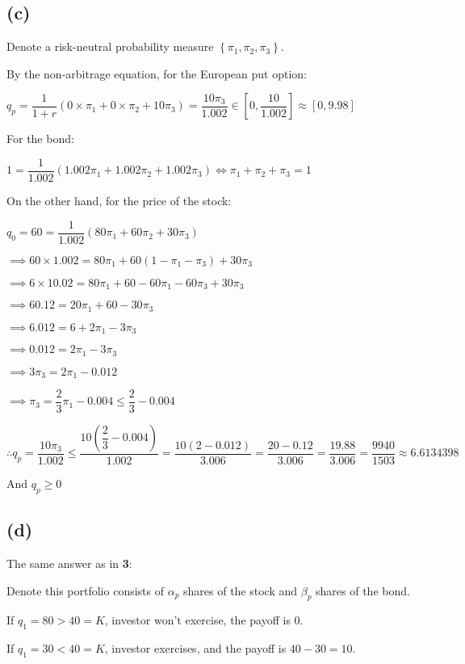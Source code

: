 \documentclass{article}
\begin{document}
\subsection*{(c)}

Denote a risk-neutral probability measure $\left\{\pi_{1}, \pi_{2}, \pi_{3}\right\}$.

By the non-arbitrage equation, for the European put option:

$q_{p}=\dfrac{1}{1+r}\left(0\times\pi_{1}+0\times\pi_{2}+10\pi_{3}\right)=\dfrac{10\pi_{3}}{1.002}\in\left[0,\dfrac{10}{1.002}\right]\approx\left[0,9.98\right]$

For the bond:

$1=\dfrac{1}{1.002}\left(1.002\pi_{1}+1.002\pi_{2}+1.002\pi_{3}\right)\iff\pi_{1}+\pi_{2}+\pi_{3}=1$

On the other hand, for the price of the stock:

$q_{0}=60=\dfrac{1}{1.002}\left(80\pi_{1}+60\pi_{2}+30\pi_{3}\right)$

$\implies60\times1.002=80\pi_{1}+60\left(1-\pi_{1}-\pi_{3}\right)+30\pi_{3}$

$\implies6\times10.02=80\pi_{1}+60-60\pi_{1}-60\pi_{3}+30\pi_{3}$

$\implies60.12=20\pi_{1}+60-30\pi_{3}$

$\implies6.012=6+2\pi_{1}-3\pi_{3}$

$\implies0.012=2\pi_{1}-3\pi_{3}$

$\implies3\pi_{3}=2\pi_{1}-0.012$

$\implies\pi_{3}=\dfrac{2}{3}\pi_{1}-0.004\leqslant\dfrac{2}{3}-0.004$

$\therefore q_{p}=\dfrac{10\pi_{3}}{1.002}\leqslant\dfrac{10\left(\dfrac{2}{3}-0.004\right)}{1.002}=\dfrac{10\left(2-0.012\right)}{3.006}=\dfrac{20-0.12}{3.006}=\dfrac{19.88}{3.006}=\dfrac{9940}{1503}\approx6.6134398$

And $q_{p}\geqslant0$

\subsection*{(d)}

The same answer as in \textbf{3}:

Denote this portfolio consists of $\alpha_{p}$ shares of the stock and $\beta_{p}$ shares of the bond.

If $q_{1}=80>40=K$, investor won't exercise, the payoff is $0$.

If $q_{1}=30<40=K$, investor exercises, and the payoff is $40-30=10$. 
\end{document}
